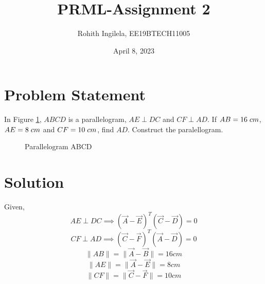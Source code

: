 \documentclass[letterpaper,12pt]{article}
\title{PRML-Assignment 2}
\author{Rohith Ingilela,  EE19BTECH11005 }
\date{April 8, 2023}
\begin{document}
\maketitle

\section{Problem Statement}

In Figure \ref*{fig:fig1}, $ABCD$ is a parallelogram, $AE \perp DC$
and $CF \perp AD$. If $AB = 16 \hspace{0.1cm} cm$, $AE = 8 \hspace{0.1cm} cm$ and
$CF = 10 \hspace{0.1cm} cm$, find $AD$. Construct the paralellogram.

\begin{figure}[!ht]
\centering


\caption{Parallelogram ABCD}
\label{fig:fig1}
\end{figure}
\section{Solution}

Given,
\begin{equation}
    AE \perp DC \implies (\Vec{A} - \Vec{E})^T (\Vec{C} - \Vec{D}) = 0
\end{equation}
\begin{equation}
    CF \perp AD \implies (\Vec{C} - \Vec{F})^T (\Vec{A} - \Vec{D}) = 0
\end{equation}
\begin{equation}
    \|AB\| = \|\Vec{A} - \Vec{B}\| = 16 cm
\end{equation}
\begin{equation}
    \|AE\| = \|\Vec{A} - \Vec{E}\| = 8 cm
\end{equation}
\begin{equation}
    \|CF\| = \|\Vec{C} - \Vec{F}\| = 10 cm
\end{equation}

\clearpage
\end{document}

